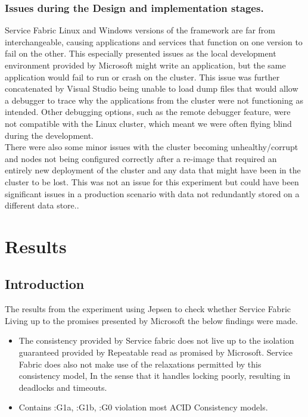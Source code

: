 \documentclass[a4paper,10pt,titlepage]{report}
\begin{document}
\subsubsection{Issues during the Design and implementation stages.}

Service Fabric Linux and Windows versions of the framework are far from interchangeable, causing applications and services that function on one version to fail on the other. This especially presented issues as the local development environment provided by Microsoft might write an application, but the same application would fail to run or crash on the cluster. This issue was further concatenated by Visual Studio being unable to load dump files that would allow a debugger to trace why the applications from the cluster were not functioning as intended. Other debugging options, such as the remote debugger feature, were not compatible with the Linux cluster, which meant we were often flying blind during the development. \\ \vspace{2mm}
There were also some minor issues with the cluster becoming unhealthy/corrupt and nodes not being configured correctly after a re-image that required an entirely new deployment of the cluster and any data that might have been in the cluster to be lost. This was not an issue for this experiment but could have been significant issues in a production scenario with data not redundantly stored on a different data store..

\newpage
\section{Results}

\subsection{Introduction}

The results from the experiment using Jepsen to check whether Service Fabric Living up to the promises presented by Microsoft the below findings were made. 
\begin{itemize}
    \item The consistency provided by Service fabric does not live up to the isolation guaranteed provided by Repeatable read as promised by Microsoft. Service Fabric does also not make use of the relaxations permitted by this consistency model, In the sense that it handles locking poorly, resulting in deadlocks and timeouts.
    \item Contains :G1a, :G1b, :G0 violation most ACID Consistency models.
\end{itemize}
\end{document}
